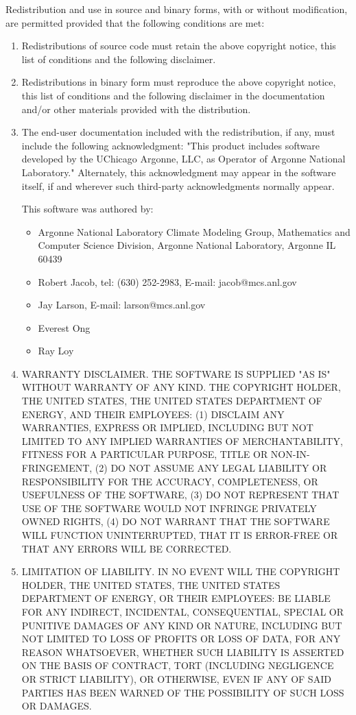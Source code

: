 Redistribution and use in source and binary forms, with or without modification, are permitted provided that the following conditions are met:
\begin{enumerate}
\item Redistributions of source code must retain the above copyright notice, this list of conditions and the following disclaimer.
\item Redistributions in binary form must reproduce the above copyright notice, this list of conditions and the following disclaimer in the documentation and/or other materials provided with the distribution.
\item The end-user documentation included with the redistribution, if any, must include the following acknowledgment: "This product includes software developed by the UChicago Argonne, LLC, as Operator of Argonne National Laboratory." Alternately, this acknowledgment may appear in the software itself, if and wherever such third-party acknowledgments normally appear.

This software was authored by:
\begin{itemize}
\item Argonne National Laboratory Climate Modeling Group, Mathematics and Computer Science Division, Argonne National Laboratory, Argonne IL 60439
\item Robert Jacob, tel: (630) 252-2983, E-mail: jacob@mcs.anl.gov
\item Jay Larson, E-mail: larson@mcs.anl.gov
\item Everest Ong
\item Ray Loy
\end{itemize}

\item WARRANTY DISCLAIMER. THE SOFTWARE IS SUPPLIED "AS IS" WITHOUT WARRANTY OF ANY KIND. THE COPYRIGHT HOLDER, THE UNITED STATES, THE UNITED STATES DEPARTMENT OF ENERGY, AND THEIR EMPLOYEES: (1) DISCLAIM ANY WARRANTIES, EXPRESS OR IMPLIED, INCLUDING BUT NOT LIMITED TO ANY IMPLIED WARRANTIES OF MERCHANTABILITY, FITNESS FOR A PARTICULAR PURPOSE, TITLE OR NON-IN- FRINGEMENT, (2) DO NOT ASSUME ANY LEGAL LIABILITY OR RESPONSIBILITY FOR THE ACCURACY, COMPLETENESS, OR USEFULNESS OF THE SOFTWARE, (3) DO NOT REPRESENT THAT USE OF THE SOFTWARE WOULD NOT INFRINGE PRIVATELY OWNED RIGHTS, (4) DO NOT WARRANT THAT THE SOFTWARE WILL FUNCTION UNINTERRUPTED, THAT IT IS ERROR-FREE OR THAT ANY ERRORS WILL BE CORRECTED. 

\item LIMITATION OF LIABILITY. IN NO EVENT WILL THE COPYRIGHT HOLDER, THE UNITED STATES, THE UNITED STATES DEPARTMENT OF ENERGY, OR THEIR EMPLOYEES: BE LIABLE FOR ANY INDIRECT, INCIDENTAL, CONSEQUENTIAL, SPECIAL OR PUNITIVE DAMAGES OF ANY KIND OR NATURE, INCLUDING BUT NOT LIMITED TO LOSS OF PROFITS OR LOSS OF DATA, FOR ANY REASON WHATSOEVER, WHETHER SUCH LIABILITY IS ASSERTED ON THE BASIS OF CONTRACT, TORT (INCLUDING NEGLIGENCE OR STRICT LIABILITY), OR OTHERWISE, EVEN IF ANY OF SAID PARTIES HAS BEEN WARNED OF THE POSSIBILITY OF SUCH LOSS OR DAMAGES.

\end{enumerate}

